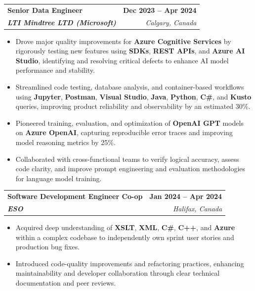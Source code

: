 \documentclass[letterpaper,11pt]{article}
\makeatletter
\newcommand{\resumeItem}[1]{
  \item\small{
    {#1 \vspace{-2pt}}
  }
}
\newcommand{\resumeSubheading}[4]{
  \vspace{-2pt}\item
    \begin{tabular*}{1.0\textwidth}[t]{l@{\extracolsep{\fill}}r}
      \textbf{#1} & \textbf{\small #2} \\
      \textit{\small#3} & \textit{\small #4} \\
    \end{tabular*}\vspace{-7pt}
}
\newcommand{\resumeItemListStart}{\begin{itemize}}
\newcommand{\resumeItemListEnd}{\end{itemize}\vspace{-5pt}}
\makeatother
\begin{document}
    \resumeSubheading
      {\textbf{Senior Data Engineer}}{\textbf{Dec 2023 -- Apr 2024}}
      {\textbf{LTI Mindtree LTD (Microsoft)}}{Calgary, Canada}
      \resumeItemListStart
        \resumeItem{Drove major quality improvements for \textbf{Azure Cognitive Services} by rigorously testing new features using \textbf{SDKs}, \textbf{REST APIs}, and \textbf{Azure AI Studio}, identifying and resolving critical defects to enhance AI model performance and stability.}
        \resumeItem{Streamlined code testing, database analysis, and container-based workflows using \textbf{Jupyter}, \textbf{Postman}, \textbf{Visual Studio}, \textbf{Java}, \textbf{Python}, \textbf{C\#}, and \textbf{Kusto} queries, improving product reliability and observability by an estimated 30\%.}
        \resumeItem{Pioneered training, evaluation, and optimization of \textbf{OpenAI GPT} models on \textbf{Azure OpenAI}, capturing reproducible error traces and improving model reasoning metrics by 25\%.}
        \resumeItem{Collaborated with cross-functional teams to verify logical accuracy, assess code clarity, and improve prompt engineering and evaluation methodologies for language model training.}
      \resumeItemListEnd
    
    \resumeSubheading
      {\textbf{Software Development Engineer Co-op}}{\textbf{Jan 2024 -- Apr 2024}}
      {\textbf{ESO}}{Halifax, Canada}
      \resumeItemListStart
        \resumeItem{Acquired deep understanding of \textbf{XSLT}, \textbf{XML}, \textbf{C\#}, \textbf{C++}, and \textbf{Azure} within a complex codebase to independently own sprint user stories and production bug fixes.}
        \resumeItem{Introduced code-quality improvements and refactoring practices, enhancing maintainability and developer collaboration through clear technical documentation and peer reviews.}
      \resumeItemListEnd
\end{document}
